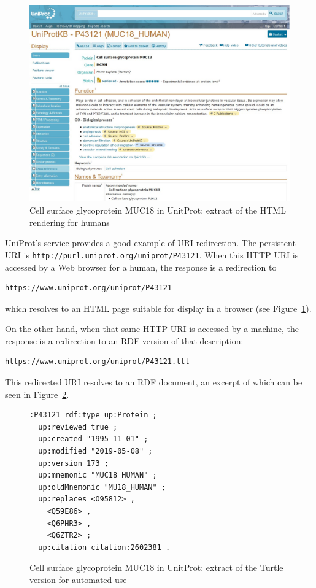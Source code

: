\begin{figure}
    \centering
    \includegraphics[width=5.0in]{media/ch5/figure-05-05.jpg}
    \caption{Cell surface glycoprotein MUC18 in UnitProt: extract of the HTML
rendering for humans}
    \label{fig:ch5.5}
\end{figure}

UniProt's service provides a good example of URI redirection.  The persistent URI is \texttt{http://purl.uniprot.org/uniprot/P43121}.  
When this HTTP URI is accessed by a Web browser for a human,  the response is a redirection to 

\begin{lstlisting}
https://www.uniprot.org/uniprot/P43121
\end{lstlisting}

which resolves to an HTML
page suitable for display in a browser (see Figure~\ref{fig:ch5.5}).   

On the other hand, when  that same HTTP URI is accessed by a 
machine,  the
response is a redirection to an RDF version of that description:

\begin{lstlisting}
https://www.uniprot.org/uniprot/P43121.ttl
\end{lstlisting}

This redirected URI resolves to an RDF document, an excerpt of which can be seen in 
Figure~\ref{fig:ch5.6}.


\begin{figure}
\begin{lstlisting}
:P43121 rdf:type up:Protein ;
  up:reviewed true ;
  up:created "1995-11-01" ;
  up:modified "2019-05-08" ;
  up:version 173 ;
  up:mnemonic "MUC18_HUMAN" ;
  up:oldMnemonic "MU18_HUMAN" ;
  up:replaces <O95812> ,
    <Q59E86> ,
    <Q6PHR3> ,
    <Q6ZTR2> ;
  up:citation citation:2602381 .
\end{lstlisting}
    \caption{Cell surface glycoprotein MUC18 in UnitProt: extract of the
Turtle version for automated use}
    \label{fig:ch5.6}
\end{figure}

